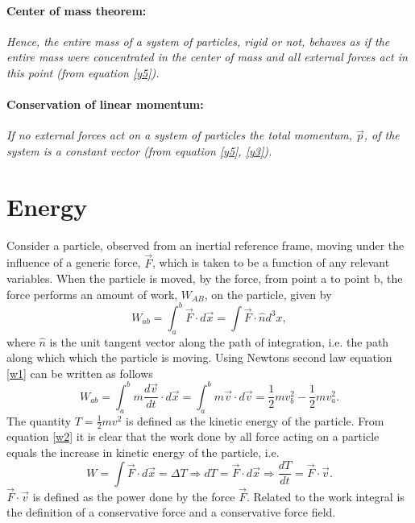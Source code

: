\paragraph{Center of mass theorem:} \emph{Hence, the entire mass of a system of particles, rigid or not, behaves as if the entire mass were concentrated in the center of mass and all external forces act in this point (from equation \eqref{y5}).} 
\paragraph{Conservation of linear momentum:}  \emph{If no external forces act on a system of particles the total momentum, $\vec{p}$, of the system is a constant vector (from equation \eqref{y5}, \eqref{y3}).} \newline


\section{Energy}
Consider a particle, observed from an inertial reference frame, moving under the influence of a generic force, $\vec{F}$, which is taken to be a function of any relevant variables. When the particle is moved, by the force, from point a to point b, the force performs an amount of work, $W_{AB}$, on the particle, given by
\begin{equation}
	W_{ab}=\int_{a}^{b}\vec{F}\cdot d\vec{x}=\int\vec{F}\cdot\hat{n} d^3x,
	\label{w1}
\end{equation} 
where $\hat{n}$ is the unit tangent vector along the path of integration, i.e. the path along which which the particle is moving. Using Newtons second law equation \eqref{w1} can be written as follows
\begin{equation}
	W_{ab}=\int_a^bm\frac{d\vec{v}}{dt}\cdot d\vec{x}=\int_{a}^{b}m\vec{v}\cdot d\vec{v}=\frac{1}{2}mv_b^2-\frac{1}{2}mv_a^2.
	\label{w2}
\end{equation} 
The quantity $T=\frac{1}{2}mv^2$ is defined as the kinetic energy of the particle. From equation \eqref{w2} it is clear that the work done by all force acting on a particle equals the increase in kinetic energy of the particle,  i.e.
\begin{equation}
	W=\int\vec{F}\cdot d\vec{x}=\Delta T\Rightarrow dT=\vec{F}\cdot d\vec{x}\Rightarrow \frac{dT}{dt}=\vec{F}\cdot \vec{v}.
	\label{w3}
\end{equation} 
$\vec{F}\cdot \vec{v}$ is defined as the power done by the force $\vec{F}$. Related to the work integral is the definition of a conservative force and a conservative force field. 
